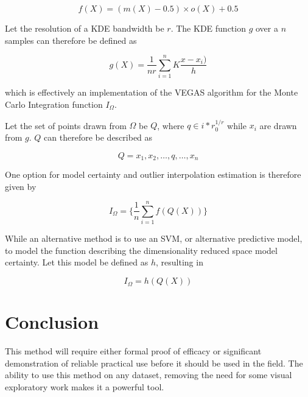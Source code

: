 \documentclass[a4paperpaper,twocolumn]{article}
\begin{document}
$$f(X) = (m(X) - 0.5) \times o(X) + 0.5$$

Let the resolution of a KDE bandwidth be $r$. The KDE function $g$ over a $n$ samples can therefore be defined as

$$g(X) = \frac{1}{nr} \sum^n_{i=1} K \frac{x - x_i)}{h}$$

which is effectively an implementation of the VEGAS algorithm for the Monte Carlo Integration function $I_\Omega$.

Let the set of points drawn from $\Omega$ be $Q$, where $q \in {i*r}^{1/r}_0$ while $x_i$ are drawn from $g$. $Q$ can therefore be described as

$$Q = {x_1, x_2, \ldots, q, \ldots, x_n}$$

One option for model certainty and outlier interpolation estimation is therefore given by

$$I_\Omega = \{\frac{1}{n} \sum^n_{i=1} f(Q(X))\}$$

While an alternative method is to use an SVM, or alternative predictive model, to model the function describing the dimensionality reduced space model certainty. Let this model be defined as $h$, resulting in

$$I_\Omega = h(Q(X))$$




\section{Conclusion}\label{Conclusion}

This method will require either formal proof of efficacy or significant demonstration of reliable practical use before it should be used in the field. The ability to use this method on any dataset, removing the need for some visual exploratory work makes it a powerful tool.

\printbibliography
\end{document}
